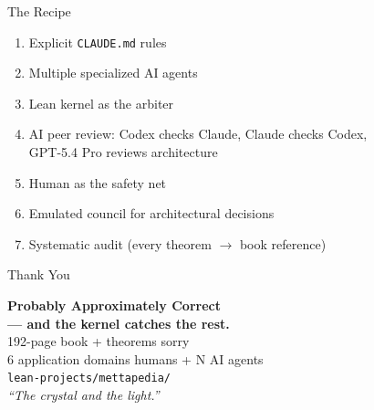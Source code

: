 \documentclass[aspectratio=169,11pt]{beamer}
\begin{document}

\begin{frame}{The Recipe}
\begin{enumerate}
\item Explicit \texttt{CLAUDE.md} rules
\item Multiple specialized AI agents
\item Lean kernel as the arbiter
\item \alert{AI peer review}: Codex checks Claude, Claude checks Codex,\\
      GPT-5.4 Pro reviews architecture
\item \alert{Human as the safety net}
\item Emulated council for architectural decisions
\item Systematic audit (every theorem $\to$ book reference)
\end{enumerate}
\end{frame}

\begin{frame}{Thank You}
\begin{center}
\large
\textbf{Probably Approximately Correct}\\
\textbf{--- and the kernel catches the rest.}\\[12pt]
\normalsize
192-page book + theorems  sorry\\[6pt]
6 application domains  humans + N AI agents\\[12pt]
\texttt{lean-projects/mettapedia/}\\[12pt]
\textit{``The crystal and the light.''}
\end{center}
\end{frame}
\end{document}
